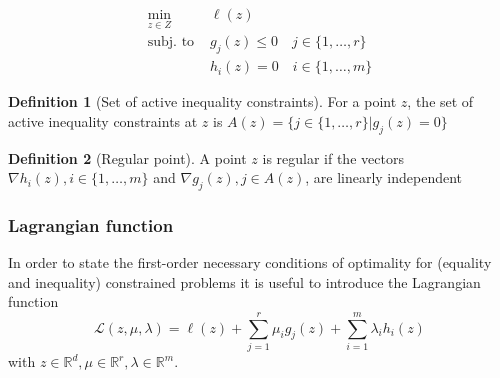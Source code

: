 \documentclass[openany]{book}
\newcommand{\R}{\mathbb{R}}               %
\theoremstyle{definition}
\newtheorem{definition}{Definition}[section]
\theoremstyle{remark}
\begin{document}
\begin{align*}
    \min_{z\in Z}\  &\ell(z)\\
    \text{subj. to } & g_j(z)\leq 0 \quad j\in\{1,\dots,r\}\\
    & h_i(z)=0 \quad i\in\{1,\dots,m\}
\end{align*}

\begin{definition}[Set of active inequality constraints]
    For a point $z$, the set of active inequality constraints at $z$ is $A(z) = \{j\in\{1,\dots,r\}|g_j(z)=0\}$
\end{definition}
\begin{definition}[Regular point]
    A point $z$ is regular if the vectors $\nabla h_i(z), i\in \{1,\dots,m\}$ and $\nabla g_j(z), j\in A(z)$, are linearly independent
\end{definition}

\subsubsection{Lagrangian function}

In order to state the first-order necessary conditions of optimality for (equality and inequality) constrained problems it is useful to introduce the Lagrangian function 
\[
    \mathcal{L}(z,\mu,\lambda)=\ell(z)+\displaystyle\sum_{j=1}^{r}\mu_ig_j(z) + \displaystyle\sum_{i=1}^{m}\lambda_i h_i(z)
\]
with $z \in \R^d, \mu\in\R^r,\lambda\in\R^m$.
\end{document}

